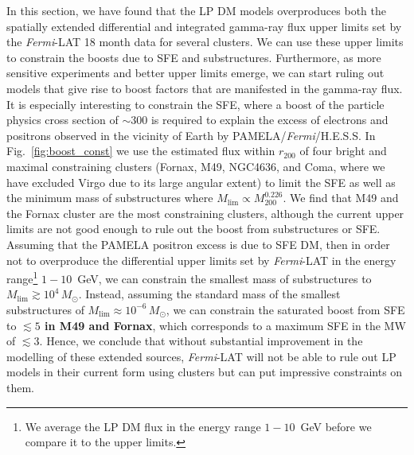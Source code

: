 \documentclass[10pt,aps,pra,reprint,amsmath,amsfonts,amssymb,showpacs,nofootinbib,floatfix]{revtex4-1}
\def\C#1{{\bf #1}}
\newcommand{\Fermi}{{\em Fermi}\xspace}
\newcommand{\rmn}{\mathrm}
\newcommand{\msun}{M_\odot}
\newcommand{\rvir}{r_{200}}
\newcommand{\mvir}{M_{200}}
\begin{document}
In this section, we have found that the LP DM models overproduces both
the spatially extended differential and integrated gamma-ray flux
upper limits set by the \Fermi-LAT 18 month data for several
clusters. We can use these upper limits to constrain the boosts due to
SFE and substructures. Furthermore, as more sensitive experiments and
better upper limits emerge, we can start ruling out models that give
rise to boost factors that are manifested in the gamma-ray flux. It is
especially interesting to constrain the SFE, where a boost of the
particle physics cross section of $\sim$300 is required to explain the
excess of electrons and positrons observed in the vicinity of Earth by
PAMELA/\Fermi/H.E.S.S. In Fig.~\ref{fig:boost_const} we use the
estimated flux within $\rvir$ of four bright and maximal constraining
clusters (Fornax, M49, NGC4636, and Coma, where we have excluded Virgo
due to its large angular extent) to limit the SFE as well as the
minimum mass of substructures where
$M_\rmn{lim}\propto\mvir^{0.226}$. We find that M49 and the Fornax
cluster are the most constraining clusters, although the current upper
limits are not good enough to rule out the boost from substructures or
SFE. Assuming that the PAMELA positron excess is due to SFE DM, then
in order not to overproduce the differential upper limits set by
\Fermi-LAT in the energy range\footnote{We average the LP DM flux in
  the energy range $1-10$~GeV before we compare it to the upper
  limits.} $1-10$~GeV, we can constrain the smallest mass of
substructures to $M_\rmn{lim}\gtrsim 10^4\,\msun$. Instead, assuming
the standard mass of the smallest substructures of $M_\rmn{lim}\approx
10^{-6}\,\msun$, we can constrain the saturated boost from SFE to
\C{$\lesssim 5$ in M49 and Fornax}, which corresponds to a maximum SFE
in the MW of $\lesssim3$. Hence, we conclude that without substantial
improvement in the modelling of these extended sources, \Fermi-LAT
will not be able to rule out LP models in their current form using
clusters but can put impressive constraints on them.
\end{document}
